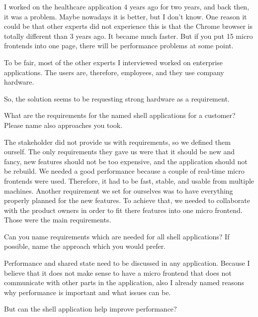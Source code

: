 \begin{description}
    \IvanJovanovic I worked on the healthcare application 4 years ago for two years, and back then, it was a problem. Maybe nowadays it is better, but I don't know. One reason it could be that other experts did not experience this is that the Chrome browser is totally different than 3 years ago. It became much faster. But if you put 15 micro frontends into one page, there will be performance problems at some point.

    \NicoVogel To be fair, most of the other experts I interviewed worked on enterprise applications. The users are, therefore, employees, and they use company hardware.

    \IvanJovanovic So, the solution seems to be requesting strong hardware as a requirement.

    \NicoVogel What are the requirements for the named shell applications for a customer? Please name also approaches you took.

    \IvanJovanovic The stakeholder did not provide us with requirements, so we defined them ourself. The only requirements they gave us were that it should be new and fancy, new features should not be too expensive, and the application should not be rebuild.
    We needed a good performance because a couple of real-time micro frontends were used. Therefore, it had to be fast, stable, and usable from multiple machines. Another requirement we set for ourselves was to have everything properly planned for the new features. To achieve that, we needed to collaborate with the product owners in order to fit there features into one micro frontend.
    Those were the main requirements.


    \NicoVogel Can you name requirements which are needed for all shell applications? If possible, name the approach which you would prefer.

    \IvanJovanovic Performance and shared state need to be discussed in any application. Because I believe that it does not make sense to have a micro frontend that does not communicate with other parts in the application, also I already named reasons why performance is important and what issues can be.


    \NicoVogel But can the shell application help improve performance?



\end{description}
